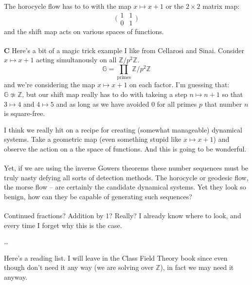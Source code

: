 \documentclass[12pt]{article}
\begin{document}
The horocycle flow has to to with the map $x \mapsto x + 1$ or the $2 \times 2$ matrix map:
$$  \big( \begin{array}{cc}1 & 1 \\ 0 & 1 \end{array}\big)$$
and the shift map acts on various spaces of functions. \\ \\
\textbf{C} Here's a bit of a magic trick example I like from Cellarosi and Sinai.  Consider $x \mapsto x+1$ acting simultanously on all $\mathbb{Z}/p^2 \mathbb{Z}$. 
$$ \mathbb{G} = \prod_{\text{primes}} \mathbb{Z}/p^2 \mathbb{Z} $$
and we're considering the map $x \mapsto x+1$ on each factor.  I'm guessing that: $\mathbb{G} \not \simeq \mathbb{Z}$, but our shift map really has to do with takeing a step $n \mapsto n+1$ so that $3 \mapsto 4$ and $4 \mapsto 5$ and as long as we have avoided $0$ for all primes $p$ that number $n$ is square-free.

\newpage

\noindent I think we really hit on a recipe for creating (somewhat manageable) dynamical systems. Take a geometric map (even something stupid like $x \mapsto x+1$) and observe the action on a the space of functions.  And this is going to be wonderful. \\ \\
Yet, if we are using the inverse Gowers theorems these number sequences must be truly nasty defying all sorts of detection methods.  The horocycle or geodesic flow, the morse flow -- are certainly the candidate dynamical systems. Yet they look so benign, how can they be capable of generating such sequences? \\ \\
Continued fractions?  Addition by 1?  Really?  I already know where to look, and every time I forget why this is the case.


\newpage

\noindent \dots 

\vfill


\noindent Here's a reading list. I will leave in the Class Field Theory book since even though don't need it any way (we are solving over $\mathbb{Z}$), in fact we may need it anyway.
\end{document}
